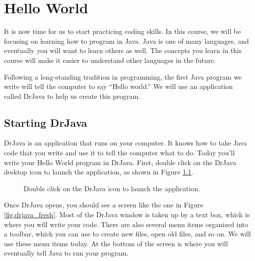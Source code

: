 \chapter{Hello World}

It is now time for us to start practicing coding skills. In this course, we will be focusing on learning how to program in Java. Java is one of many languages, and eventually you will want to learn others as well. The concepts you learn in this course will make it easier to understand other languages in the future.

Following a long-standing tradition in programming, the first Java program we write will tell the computer to say ``Hello world.'' We will use an application called DrJava to help us create this program.

\section{Starting DrJava}

DrJava is an application that runs on your computer. It knows how to take Java code that you write and use it to tell the computer what to do. Today you'll write your Hello World program in DrJava. First, double click on the DrJava desktop icon to launch the application, as shown in Figure \ref{fig:drjava_launch}.

\begin{figure}
    \centering
    \caption{Double click on the DrJava icon to launch the application.}
    \label{fig:drjava_launch}
\end{figure}

Once DrJava opens, you should see a screen like the one in Figure \ref{fig:drjava_fresh}. Most of the DrJava window is taken up by a text box, which is where you will write your code. There are also several menu items organized into a toolbar, which you can use to create new files, open old files, and so on. We will use these menu items today. At the bottom of the screen is where you will eventually tell Java to run your program.

